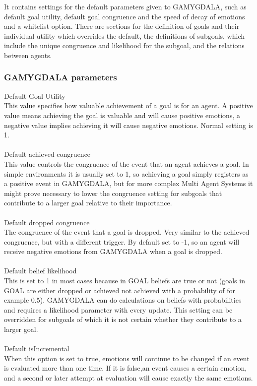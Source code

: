 \documentclass[11pt]{article}
\begin{document}
It contains settings for the default parameters given to GAMYGDALA, such as default goal utility, default goal congruence and the speed of decay of emotions and a whitelist option. There are sections for the definition of goals and their individual utility which overrides the default, the definitions of subgoals, which include the unique congruence and likelihood for the subgoal, and the relations between agents.

\subsubsection*{GAMYGDALA parameters}
Default Goal Utility\\
This value specifies how valuable achievement of a goal is for an agent. A positive value means achieving the goal is valuable and will cause positive emotions, a negative value implies achieving it will cause negative emotions. Normal setting is 1.\\
\\
Default achieved congruence\\
This value controls the congruence of the event that an agent achieves a goal. In simple environments it is usually set to 1, so achieving a goal simply registers as a positive event in GAMYGDALA, but for more complex Multi Agent Systems it might prove necessary to lower the congruence setting for subgoals that contribute to a larger goal relative to their importance.\\
\\
Default dropped congruence\\
The congruence of the event that a goal is dropped. Very similar to the achieved congruence, but with a different trigger. By default set to -1, so an agent will receive negative emotions from GAMYGDALA when a goal is dropped.\\
\\
Default belief likelihood\\
This is set to 1 in most cases because in GOAL beliefs are true or not (goals in GOAL are either dropped or achieved not achieved with a probability of for example 0.5). GAMYGDALA can do calculations on beliefs with probabilities and requires a likelihood parameter with every update. This setting can be overridden for subgoals of which it is not certain whether they contribute to a larger goal.\\
\\
Default isIncremental\\
When this option is set to true, emotions will continue to be changed if an event is evaluated more than one time. If it is false,an event causes a certain emotion, and a second or later attempt at evaluation will cause exactly the same emotions.
\\
\end{document}
